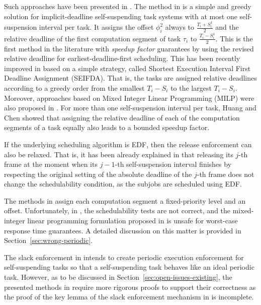 Such approaches have been presented in 
\cite{RTSS-KimANR13,RTSS-ChenL14,WC16-suspend-DATE,DBLP:journals/ieicet/DingTT09}. The method in \cite{RTSS-ChenL14} is a simple and greedy solution for 
implicit-deadline self-suspending task systems with at most one self-suspension interval per task. It assigns the 
offset $\phi_i^2$ always to $\frac{T_i+S_i^1}{2}$ and the relative deadline of the first computation segment of task $\tau_i$ to 
$\frac{T_i-S_i^1}{2}$. This is the first method in the literature with \emph{speedup factor} guarantees by using the revised relative 
deadline for earliest-deadline-first scheduling. This has been recently improved 
in \cite{Bruggen16RTNS} based on a simple strategy, called Shortest Execution Interval First Deadline
Assignment (SEIFDA). That is, the tasks are assigned relative deadlines according to a greedy order from the smallest $T_i-S_i$ to the largest $T_i-S_i$.
Moreover, approaches based on Mixed Integer Linear Programming (MILP) were also proposed in \cite{Peng-Fisher-RTCSA2016,Bruggen16RTNS}.
For more than one self-suspension interval per task, Huang and Chen \cite{WC16-suspend-DATE} showed that assigning the relative deadline of each of the computation segments of a task equally also leads to a bounded speedup factor.


If the underlying scheduling algorithm is EDF, then the release
enforcement can also be relaxed. That is, it has been already
explained in \cite{Bruggen16RTNS,RTSS-ChenL14} that releasing its
$j$-th frame at the moment when its $j-1$-th self-suspension interval
finishes by respecting the original setting of the absolute deadline
of the $j$-th frame does not change the schedulability condition, as
the subjobs are scheduled using EDF.



The methods in \cite{RTSS-KimANR13,DBLP:journals/ieicet/DingTT09} assign each computation segment a fixed-priority level and an offset. 
Unfortunately,  in \cite{RTSS-KimANR13,DBLP:journals/ieicet/DingTT09}, the schedulability tests are not correct, and the mixed-integer 
linear programming formulation proposed in \cite{RTSS-KimANR13} is unsafe for worst-case response time guarantees. 
A detailed discussion on this matter is 
provided in Section~\ref{sec:wrong-periodic}.

\label{sec:slack-enforce}

The slack enforcement in \cite{LR:rtas10} intends to create periodic execution enforcement 
for self-suspending tasks so that a self-suspending task behaves like an ideal periodic task.  However, as to be discussed in 
Section~\ref{sec:open-issues-existing}, the presented methods in \cite{LR:rtas10} require more rigorous proofs to support 
their correctness as the proof of the key lemma of the slack enforcement mechanism in \cite{LR:rtas10} is incomplete.

